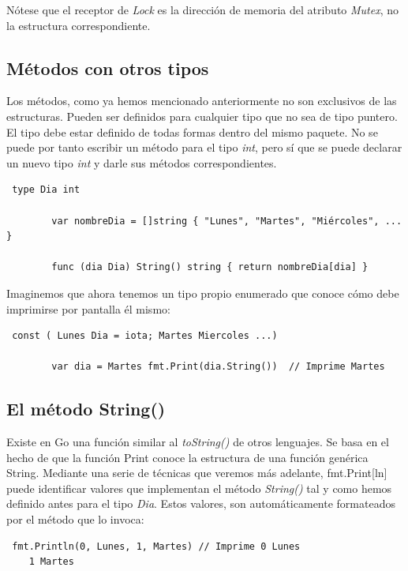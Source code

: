 	Nótese que el receptor de \textit{Lock} es la dirección de memoria del
	atributo \textit{Mutex}, no la estructura correspondiente.

	\subsection{Métodos con otros tipos}

	Los métodos, como ya hemos mencionado anteriormente no son exclusivos de las
	estructuras. Pueden ser definidos para cualquier tipo que no sea de tipo
	puntero.\\

	El tipo debe estar definido de todas formas dentro del mismo paquete. No se
	puede por tanto escribir un método para el tipo \textit{int}, pero sí que se
	puede declarar un nuevo tipo \textit{int} y darle sus métodos
	correspondientes.

	\begin{verbatim} type Dia int
    
		var nombreDia = []string { "Lunes", "Martes", "Miércoles", ...  }
    
		func (dia Dia) String() string { return nombreDia[dia] } \end{verbatim}

	Imaginemos que ahora tenemos un tipo propio enumerado que conoce cómo debe
	imprimirse por pantalla él mismo:

	\begin{verbatim} const ( Lunes Dia = iota; Martes Miercoles ...)
    
		var dia = Martes fmt.Print(dia.String())  // Imprime Martes
		\end{verbatim}

	\subsection{El método String()}

	Existe en Go una función similar al \textit{toString()} de otros lenguajes.
	Se basa en el hecho de que la función Print conoce la estructura de una
	función genérica String. Mediante una serie de técnicas que veremos más
	adelante, fmt.Print[ln] puede identificar valores que implementan el método
	\textit{String()} tal y como hemos definido antes para el tipo \textit{Dia}.
	Estos valores, son automáticamente formateados por el método que lo invoca:

	\begin{verbatim} fmt.Println(0, Lunes, 1, Martes) // Imprime 0 Lunes
	1 Martes \end{verbatim}

